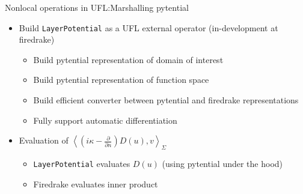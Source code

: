 \documentclass{beamer}
\begin{document}
\begin{frame}{Nonlocal operations in UFL:\@ Marshalling pytential}
    \begin{itemize}
        \item Build \texttt{LayerPotential} as a UFL external operator
            (in-development at firedrake)
            \begin{itemize}
                \vfill
                \item<2->[\checkmark] Build pytential representation
                    of domain of interest
                \vfill
                \item<4->[\checkmark] Build pytential representation
                    of function space
                \vfill
                \item<5->[\checkmark] Build efficient converter between
                    pytential and firedrake representations
                \vfill
                \item<6-> Fully support automatic differentiation
            \end{itemize}
        \vfill
    \item<7-> Evaluation of $\left\langle(i\kappa - \tfrac{\partial}{\partial n})D(u), v\right\rangle_\Sigma$ 
        \begin{itemize}
            \vfill
            \item<8->[\checkmark] \texttt{LayerPotential} evaluates $D(u)$
                (using pytential under the hood)
            \vfill
            \item<9->[\checkmark] Firedrake evaluates inner product
        \end{itemize}
    \end{itemize}
\end{frame}
\end{document}
